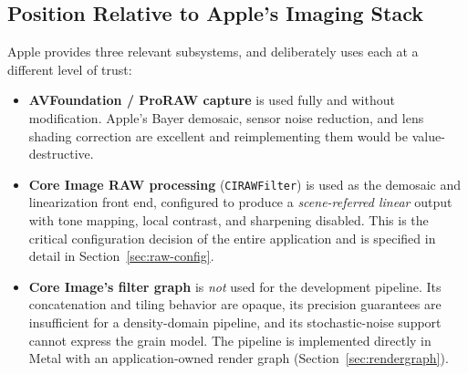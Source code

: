 \subsection{Position Relative to Apple's Imaging Stack}

Apple provides three relevant subsystems, and \EM{} deliberately uses each at a
different level of trust:

\begin{itemize}
\item \textbf{AVFoundation / ProRAW capture} is used fully and without
modification. Apple's Bayer demosaic, sensor noise reduction, and lens shading
correction are excellent and reimplementing them would be value-destructive.
\item \textbf{Core Image RAW processing} (\texttt{CIRAWFilter}) is used as the
demosaic and linearization front end, configured to produce a
\emph{scene-referred linear} output with tone mapping, local contrast, and
sharpening disabled. This is the critical configuration decision of the entire
application and is specified in detail in Section~\ref{sec:raw-config}.
\item \textbf{Core Image's filter graph} is \emph{not} used for the development
pipeline. Its concatenation and tiling behavior are opaque, its precision
guarantees are insufficient for a density-domain pipeline, and its
stochastic-noise support cannot express the grain model. The pipeline is
implemented directly in Metal with an application-owned render graph
(Section~\ref{sec:rendergraph}).
\end{itemize}
